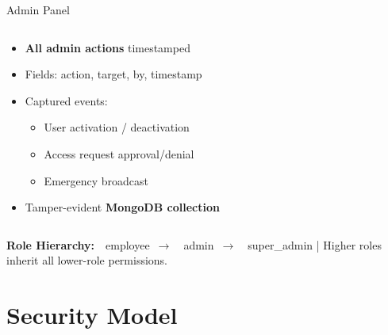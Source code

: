 \documentclass[aspectratio=169,12pt]{beamer}
\begin{document}
\begin{frame}{Admin Panel}
\begin{columns}[t]
\begin{tcolorbox}[colback=SlideGray,colframe=AccentGold,arc=5pt,
  title={\faHistory\ \textbf{Audit Logs}},
  fonttitle=\bfseries\color{white}\small,
  attach boxed title to top left={yshift=-2mm,xshift=3mm},
  boxed title style={colback=AccentGold!80!black,arc=3pt},
  left=4pt,right=4pt,top=6pt,bottom=4pt]
\scriptsize
\begin{itemize}\setlength\itemsep{4pt}
  \item \textbf{All admin actions} timestamped
  \item Fields: action, target, by, timestamp
  \item Captured events:
    \begin{itemize}\setlength\itemsep{2pt}
      \item[\faCircleO] User activation / deactivation
      \item[\faCircleO] Access request approval/denial
      \item[\faCircleO] Emergency broadcast
    \end{itemize}
  \item Tamper-evident \textbf{MongoDB collection}
\end{itemize}
\end{tcolorbox}
\end{columns}

\vspace{6pt}
\begin{tcolorbox}[colback=BPDark!5,colframe=BPDark,arc=4pt,
  left=6pt,right=6pt,top=3pt,bottom=3pt]
\scriptsize\centering
\textbf{Role Hierarchy:}\
\textcolor{TextMid}{\faUser\ employee}\ $\longrightarrow$\
\textcolor{AccentBlue}{\faUser\ admin}\ $\longrightarrow$\
\textcolor{AccentRed}{\faUserSecret\ super\_admin}
\quad|\quad
Higher roles inherit all lower-role permissions.
\end{tcolorbox}
\end{frame}

\section{Security Model}
\end{document}
